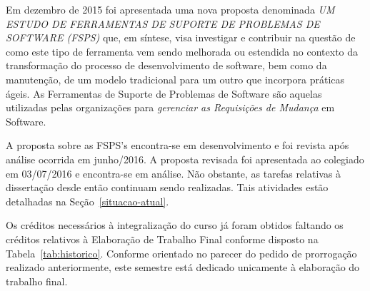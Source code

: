 \documentclass[10pt,a4paper]{report}
\begin{document}
Em dezembro de 2015 foi apresentada uma nova proposta denominada  \textit{UM
	ESTUDO DE FERRAMENTAS DE SUPORTE DE PROBLEMAS DE SOFTWARE (FSPS)} que, em
síntese, visa investigar e contribuir na questão de como este tipo de ferramenta
vem sendo melhorada ou estendida no contexto da transformação do processo de
desenvolvimento de software, bem como da manutenção, de um modelo tradicional
para um outro que incorpora práticas ágeis. As Ferramentas de Suporte de
Problemas de Software são aquelas utilizadas pelas organizações para
\textit{gerenciar as Requisições de Mudança}\cite{1703974} em Software.

A proposta sobre as FSPS's encontra-se em desenvolvimento e foi revista após
análise ocorrida em junho/2016. A proposta revisada foi
apresentada ao colegiado em 03/07/2016 e encontra-se em análise. Não
obstante, as tarefas relativas à dissertação desde então continuam sendo
realizadas. Tais atividades estão detalhadas na Seção~\ref{situacao-atual}.

Os créditos necessários à integralização do curso já foram obtidos faltando os
créditos relativos à Elaboração de Trabalho Final conforme disposto na
Tabela~\ref{tab:historico}. Conforme orientado no parecer do pedido de
prorrogação realizado anteriormente, este semestre está dedicado unicamente à
elaboração do trabalho final.
\end{document}
